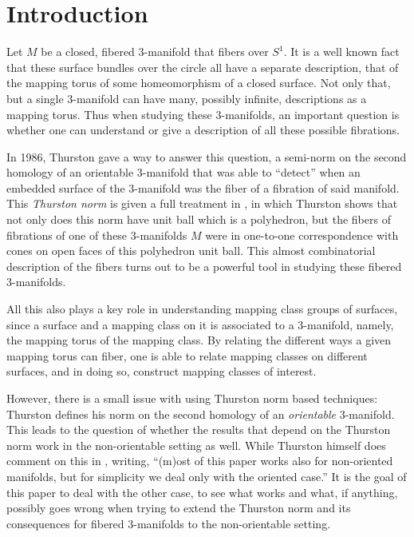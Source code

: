 \section{Introduction}
\label{sec:introduction}

Let $M$ be a closed, fibered 3-manifold that fibers over $S^1$. It is a well known fact that these surface
bundles over the circle all have a separate description, that of the mapping torus of some homeomorphism of a
closed surface. Not only that, but a single 3-manifold can have many, possibly infinite, descriptions as a
mapping torus. Thus when studying these 3-manifolds, an important question is whether one can understand or
give a description of all these possible fibrations.

In 1986, Thurston gave a way to answer this question, a semi-norm on the second homology of an orientable
3-manifold that was able to ``detect'' when an embedded surface of the 3-manifold was the fiber of a fibration
of said manifold. This \textit{Thurston norm} is given a full treatment in \cite{thurston1986norm}, in which
Thurston shows that not only does this norm have unit ball which is a polyhedron, but the fibers of fibrations
of one of these 3-manifolds $M$ were in one-to-one correspondence with cones on open faces of this polyhedron
unit ball. This almost combinatorial description of the fibers turns out to be a powerful tool in studying
these fibered 3-manifolds.

All this also plays a key role in understanding mapping class groups of surfaces, since a surface and
a mapping class on it is associated to a $3$-manifold, namely, the mapping torus of the mapping class.
By relating the different ways a given mapping torus can fiber, one is able to relate mapping classes
on different surfaces, and in doing so, construct mapping classes of interest.

However, there is a small issue with using Thurston norm based techniques: Thurston defines his norm on the
second homology of an \textit{orientable} 3-manifold. This leads to the question of whether the results that
depend on the Thurston norm work in the non-orientable setting as well. While Thurston himself does comment on
this in \cite{thurston1986norm}, writing, ``(m)ost of this paper works also for non-oriented manifolds, but
for simplicity we deal only with the oriented case.'' It is the goal of this paper to deal with the other case, to
see what works and what, if anything, possibly goes wrong when trying to extend the Thurston norm and its
consequences for fibered 3-manifolds to the non-orientable setting.

